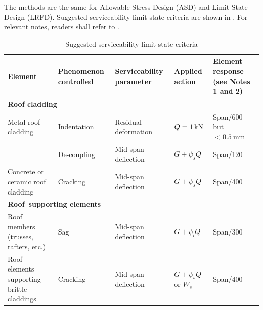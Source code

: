 The methods are the same for Allowable Stress Design (ASD) and Limit State Design (LRFD).
Suggested serviceability limit state criteria are shown in .
For relevant notes, readers shall refer to .
\begin{table}
\centering\scriptsize
\caption{Suggested serviceability limit state criteria}\label{tab:serviceability_criteria}\renewcommand{\arraystretch}{.85}
\begin{tabular}{lllll}
	\toprule
	\textbf{Element}                                                 & \textbf{Phenomenon controlled}        & \textbf{Serviceability parameter} & \textbf{Applied action}     & \textbf{Element response (see Notes 1 and 2)} \\ \midrule
	\multicolumn{5}{l}{\textbf{Roof cladding}}                                                                                                                                                                                 \\ \midrule
	Metal roof cladding                                              & Indentation                           & Residual deformation              & $Q=\SI{1}{\kilo\newton}$             & Span/600 but $<\SI{0.5}{\mm}$                 \\
	                                                                 & De-coupling                           & Mid-span deflection               & $G+\psi_sQ$                 & Span/120                                      \\
	Concrete or ceramic roof cladding                                & Cracking                              & Mid-span deflection               & $G+\psi_sQ$                 & Span/400                                      \\ \midrule
	\multicolumn{5}{l}{\textbf{Roof--supporting elements}}                                                                                                                                                                     \\ \midrule
	Roof members (trusses, rafters, etc.)                            & Sag                                   & Mid-span deflection               & $G+\psi_lQ$                 & Span/300                                      \\
	Roof elements supporting brittle claddings                       & Cracking                              & Mid-span deflection               & $G+\psi_sQ$ or $W_s$        & Span/400                                      \\ \midrule

\end{tabular}
\end{table}
